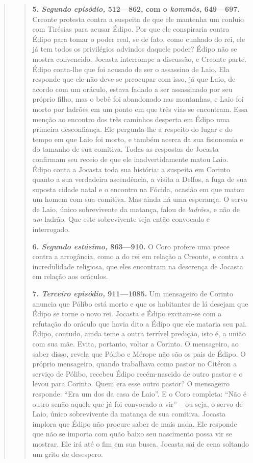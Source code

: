 \begin{verse}
\begin{verse}
\textbf{5. \emph{Segundo episódio,} 512---862, com o \emph{kommós,} 649---697.} 
Creonte protesta contra a suspeita de que ele mantenha um
conluio com Tirésias para acusar Édipo. Por que ele conspiraria contra
Édipo para tomar o poder real, se de fato, como cunhado do rei, ele já
tem todos os privilégios advindos daquele poder? Édipo não se mostra
convencido. Jocasta interrompe a discussão, e Creonte parte. Édipo
conta-lhe que foi acusado de ser o assassino de Laio. Ela responde que
ele não deve se preocupar com isso, já que Laio, de acordo com um
oráculo, estava fadado a ser assassinado por seu próprio filho, mas o
bebê foi abandonado nas montanhas, e Laio foi morto por ladrões em um
ponto em que três vias se encontram. Essa menção ao encontro dos três
caminhos desperta em Édipo uma primeira desconfiança. Ele pergunta-lhe a
respeito do lugar e do tempo em que Laio foi morto, e também acerca da
sua fisionomia e do tamanho de sua comitiva. Todas as respostas de
Jocasta confirmam seu receio de que ele inadvertidamente matou Laio.
Édipo conta a Jocasta toda sua história: a suspeita em Corinto quanto a
sua verdadeira ascendência, a visita a Delfos, a fuga de sua suposta
cidade natal e o encontro na Fócida, ocasião em que matou um homem com
sua comitiva. Mas ainda há uma esperança. O servo de Laio, único
sobrevivente da matança, falou de \emph{ladrões}, e não de \emph{um}
ladrão. Que este sobrevivente seja então convocado e interrogado.

\textbf{6. \emph{Segundo estásimo,} 863---910.} O Coro profere uma prece
contra a arrogância, como a do rei em relação a Creonte, e contra a
incredulidade religiosa, que eles encontram na descrença de Jocasta em
relação aos oráculos.

\textbf{7. \emph{Terceiro episódio,} 911---1085.} Um mensageiro de
Corinto anuncia que Pólibo está morto e que os habitantes de lá desejam
que Édipo se torne o novo rei. Jocasta e Édipo excitam-se com a
refutação do oráculo que havia dito a Édipo que ele mataria seu pai.
Édipo, contudo, ainda teme a outra terrível predição, isto é, a união
com sua mãe. Evita, portanto, voltar a Corinto. O mensageiro, ao saber
disso, revela que Pólibo e Mérope não são os pais de Édipo. O próprio
mensageiro, quando trabalhava como pastor no Citéron a serviço de
Pólibo, recebeu Édipo recém-nascido de outro pastor e o levou para
Corinto. Quem era esse outro pastor? O mensageiro responde: ``Era um dos
da casa de Laio''. E o Coro completa: ``Não é outro senão aquele que já
foi convocado a vir'' -- ou seja, o servo de Laio, único sobrevivente da
matança de sua comitiva. Jocasta implora que Édipo não procure saber de
mais nada. Ele responde que não se importa com quão baixo seu nascimento
possa vir se mostrar. Ele irá até o fim em sua busca. Jocasta sai de
cena soltando um grito de desespero.


\end{verse}
\end{verse}
